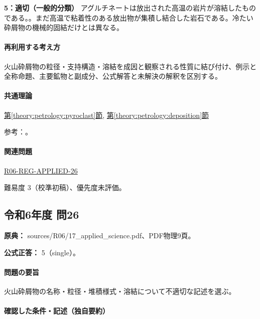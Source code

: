 \noindent\textbf{5：適切（一般的分類）} アグルチネートは放出された高温の岩片が溶結したものである。。まだ高温で粘着性のある放出物が集積し結合した岩石である。冷たい砕屑物の機械的固結だけとは異なる。\par

\paragraph{再利用する考え方} 火山砕屑物の粒径・支持構造・溶結を成因と観察される性質に結び付け、例示と全称命題、主要鉱物と副成分、公式解答と未解決の解釈を区別する。

\paragraph{共通理論} \hyperref[theory:petrology:pyroclast]{第\ref*{theory:petrology:pyroclast}節}, \hyperref[theory:petrology:deposition]{第\ref*{theory:petrology:deposition}節}

\par 参考：\cite{usgs_tephra_sizes,usgs_pinatubo1996,usgs_ash_density,usgs_bishop_tuff}。

\paragraph{関連問題} \hyperref[q:r06-reg-applied-26]{R06-REG-APPLIED-26}

\par 難易度 3（校準初稿）、優先度未評価。

\subsection{令和6年度 問26}
\label{q:r06-reg-applied-26}

\noindent\textbf{原典：} sources/R06/17\_applied\_science.pdf、PDF物理9頁。

\textbf{公式正答：} 5（single）。

\paragraph{問題の要旨} 火山砕屑物の名称・粒径・堆積様式・溶結について不適切な記述を選ぶ。

\paragraph{確認した条件・記述（独自要約）}\mbox{}\par


